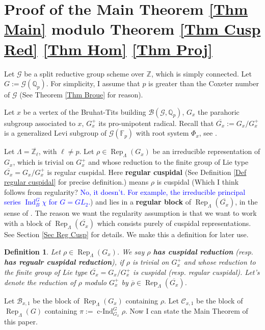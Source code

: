 \documentclass{article}
\newcommand{\blue}[1]{\textcolor{blue}{#1}}
\newtheorem{definition}{Definition}
\DeclareMathOperator{\cInd}{\operatorname{c-Ind}}
\DeclareMathOperator{\Ind}{\operatorname{Ind}}
\newcommand{\Rep}{\operatorname{Rep}}
\begin{document}
	
	\section{Proof of the Main Theorem \ref{Thm Main} modulo Theorem \ref{Thm Cusp Red} \ref{Thm Hom} \ref{Thm Proj}}
	Let $\mathcal{G}$ be a split reductive group scheme over $\mathbb{Z}$, which is simply connected. Let $G:=\mathcal{G}(\mathbb{Q}_p)$. For simplicity, I assume that $p$ is greater than the Coxeter number of $\mathcal{G}$ (See Theorem \ref{Thm Broue} for reason).
	
	Let $x$ be a vertex of the Bruhat-Tits building $\mathcal{B}(\mathcal{G}, \mathbb{Q}_p)$, $G_x$ the parahoric subgroup associated to $x$, $G_x^+$ its pro-unipotent radical. Recall that $\overline{G_x}:=G_x/G_x^+$ is a generalized Levi subgroup of $\mathcal{G}(\mathbb{F}_p)$ with root system $\Phi_x$, see \cite[Theorem 3.17]{rabinoff2003bruhat}. 
	
	Let $\Lambda=\overline{\mathbb{Z}_\ell}$, with $\ell \neq p$. Let $\rho \in \Rep_{\Lambda}(G_x)$ be an irreducible representation of $G_x$, which is trivial on $G_x^+$ and whose reduction to the finite group of Lie type $\overline{G_x}=G_x/G_x^+$ is  
	regular cuspidal. Here \textbf{regular cuspidal} (See Definition \ref{Def regular cuspidal} for precise definition.) means $\rho$ is cuspidal (Which I think follows from regularity? \blue{No, it doesn't. For example, the irreducible principal series $\Ind_B^G\chi$ for $G=GL_2$.}) and lies in a \textbf{regular block} of $\Rep_{\Lambda}(\overline{G_x})$, in the sense of \cite{broue1990isometries}. The reason we want the regularity assumption is that we want to work with a block of $\Rep_{\Lambda}(\overline{G_x})$ which consists purely of cuspidal representations. See Section \ref{Sec Reg Cusp} for details. We make this a definition for later use.
	
	\begin{definition}
		Let $\rho \in \Rep_{\Lambda}(G_x)$. We say $\rho$ \textbf{has cuspidal reduction} (resp. \textbf{has regualr cuspidal reduction}), if $\rho$ is trivial on $G_x^+$ and whose reduction to the finite group of Lie type $\overline{G_x}=G_x/G_x^+$ is cuspidal (resp. regular cuspidal). Let's denote the reduction of $\rho$ modulo $G_x^+$ by $\overline{\rho} \in \Rep_{\Lambda}(\overline{G_x})$.
	\end{definition}
	
	Let $\mathcal{B}_{x,1}$ be the block of $\Rep_{\Lambda}(G_x)$ containing $\rho$. Let $\mathcal{C}_{x,1}$ be the block of $\Rep_{\Lambda}(G)$ containing $\pi:=\cInd_{G_x}^G\rho$. Now I can state the Main Theorem of this paper.
	
\end{document}
